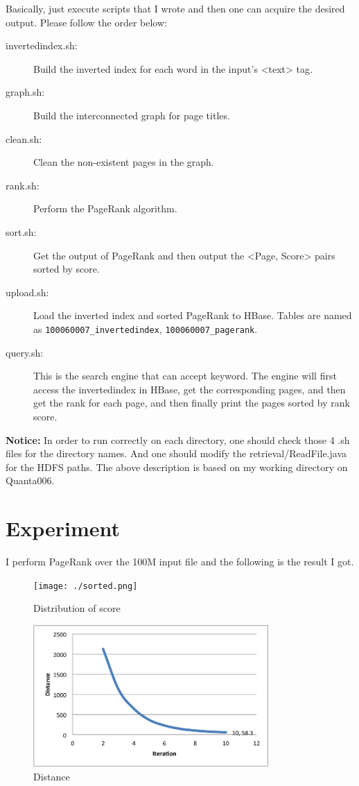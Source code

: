 \documentclass[12pt,a4paper]{article}
\begin{document}
Basically, just execute scripts that I wrote and then one can acquire the desired output. Please follow the order below:
\begin{description}  
\item[invertedindex.sh:] Build the inverted index for each word in the input's <text> tag.
\item[graph.sh:] Build the interconnected graph for page titles.
\item[clean.sh:] Clean the non-existent pages in the graph. 
\item[rank.sh:] Perform the PageRank algorithm.
\item[sort.sh:] Get the output of PageRank and then output the <Page, Score> pairs sorted by score.
\item[upload.sh:] Load the inverted index and sorted PageRank to HBase. Tables are named as \verb|100060007_invertedindex|, \verb|100060007_pagerank|.
\item[query.sh:] This is the search engine that can accept keyword. The engine will first access the invertedindex in HBase, get the corresponding pages, and then get the rank for each page, and then finally print the pages sorted by rank score.
\end{description}

{\bf Notice:} In order to run correctly on each directory, one should check those 4 .sh files for the directory names. And one should modify the retrieval/ReadFile.java for the HDFS paths. The above description is based on my working directory on Quanta006.


\section{Experiment}
I perform PageRank over the 100M input file and the following is the result I got.
\begin{figure}[h!]
  \centering
     \texttt{[image: ./sorted.png]}
     \caption{Distribution of score}
\end{figure}

\begin{figure}[h!]
  \centering
     \includegraphics[width=0.8\textwidth]{./distance.png}
     \caption{Distance}
\end{figure}
\end{document}
